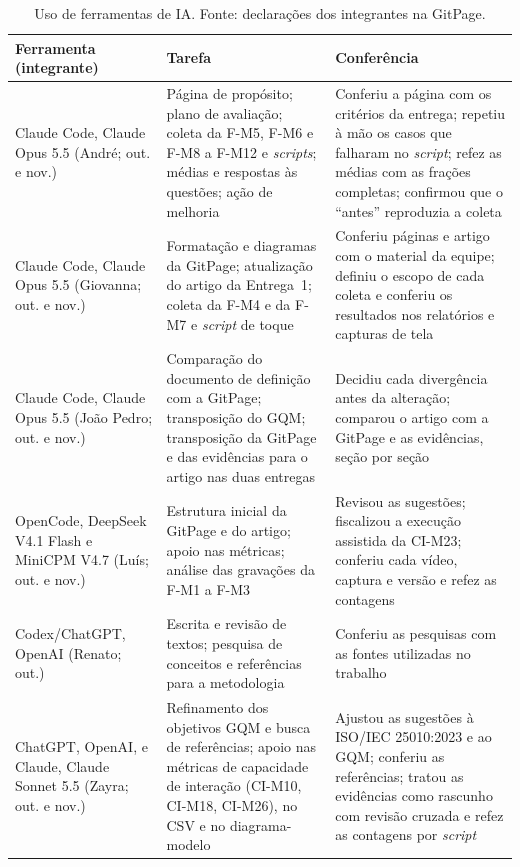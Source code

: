 \documentclass[conference]{IEEEtran}
\begin{document}
\begin{table}[!h]
\centering
\scriptsize
\caption{Uso de ferramentas de IA. Fonte: declarações dos integrantes na GitPage.}
\label{tab:ia}
\setlength{\tabcolsep}{2.5pt}
\begin{tabular}{@{}L{1.7cm} L{3.2cm} L{3.4cm}@{}}
\toprule
\textbf{Ferramenta (integrante)} & \textbf{Tarefa} & \textbf{Conferência}\\
\midrule
Claude Code, Claude Opus 5.5 (André; out. e nov.) & Página de propósito; plano de avaliação; coleta da F-M5, F-M6 e F-M8 a F-M12 e \textit{scripts}; médias e respostas às questões; ação de melhoria & Conferiu a página com os critérios da entrega; repetiu à mão os casos que falharam no \textit{script}; refez as médias com as frações completas; confirmou que o ``antes'' reproduzia a coleta\\
Claude Code, Claude Opus 5.5 (Giovanna; out. e nov.) & Formatação e diagramas da GitPage; atualização do artigo da Entrega~1; coleta da F-M4 e da F-M7 e \textit{script} de toque & Conferiu páginas e artigo com o material da equipe; definiu o escopo de cada coleta e conferiu os resultados nos relatórios e capturas de tela\\
Claude Code, Claude Opus 5.5 (João Pedro; out. e nov.) & Comparação do documento de definição com a GitPage; transposição do GQM; transposição da GitPage e das evidências para o artigo nas duas entregas & Decidiu cada divergência antes da alteração; comparou o artigo com a GitPage e as evidências, seção por seção\\
OpenCode, DeepSeek V4.1 Flash e MiniCPM V4.7 (Luís; out. e nov.) & Estrutura inicial da GitPage e do artigo; apoio nas métricas; análise das gravações da F-M1 a F-M3 & Revisou as sugestões; fiscalizou a execução assistida da CI-M23; conferiu cada vídeo, captura e versão e refez as contagens\\
Codex/ChatGPT, OpenAI (Renato; out.) & Escrita e revisão de textos; pesquisa de conceitos e referências para a metodologia & Conferiu as pesquisas com as fontes utilizadas no trabalho\\
ChatGPT, OpenAI, e Claude, Claude Sonnet 5.5 (Zayra; out. e nov.) & Refinamento dos objetivos GQM e busca de referências; apoio nas métricas de capacidade de interação (CI-M10, CI-M18, CI-M26), no CSV e no diagrama-modelo & Ajustou as sugestões à ISO/IEC 25010:2023 e ao GQM; conferiu as referências; tratou as evidências como rascunho com revisão cruzada e refez as contagens por \textit{script}\\
\bottomrule
\end{tabular}
\end{table}
\end{document}
